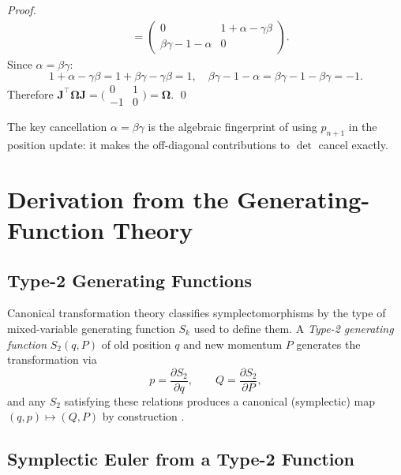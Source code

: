 \documentclass[11pt]{article}
\newcommand{\pderiv}[2]{\frac{\partial #1}{\partial #2}}
\newcommand{\J}{\mathbf{J}}          %
\newcommand{\Omg}{\boldsymbol{\Omega}} %
\begin{document}
\begin{proof}
\begin{align*}
    &=
    \begin{pmatrix}
      0 & 1 + \alpha - \gamma\beta \\
      \beta\gamma - 1 - \alpha & 0
    \end{pmatrix}.
  \end{align*}
  Since $\alpha = \beta\gamma$:
  \[
    1 + \alpha - \gamma\beta = 1 + \beta\gamma - \gamma\beta = 1,\quad
    \beta\gamma - 1 - \alpha = \beta\gamma - 1 - \beta\gamma = -1.
  \]
  Therefore $\J^{\top}\Omg\J = \bigl(\begin{smallmatrix}0 & 1 \\ -1 &
  0\end{smallmatrix}\bigr) = \Omg$. \qed
\end{proof}

\noindent The key cancellation $\alpha = \beta\gamma$ is the algebraic
fingerprint of using $p_{n+1}$ in the position update: it makes the
off-diagonal contributions to $\det$ cancel exactly.

\section{Derivation from the Generating-Function Theory}

\subsection{Type-2 Generating Functions}

Canonical transformation theory \cite{Goldstein2002} classifies
symplectomorphisms by the type of mixed-variable generating function
$S_k$ used to define them.  A \emph{Type-2 generating function}
$S_2(q, P)$ of old position $q$ and new momentum $P$ generates the
transformation via
\begin{equation}\label{eq:F2_relations}
  p = \pderiv{S_2}{q},\qquad Q = \pderiv{S_2}{P},
\end{equation}
and any $S_2$ satisfying these relations produces a canonical (symplectic)
map $(q, p) \mapsto (Q, P)$ by construction \cite{Hairer2006}.

\subsection{Symplectic Euler from a Type-2 Function}
\end{document}
